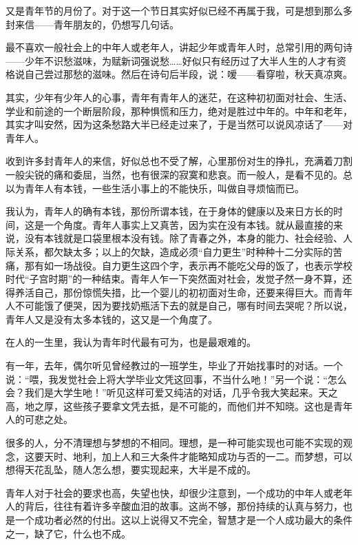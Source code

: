 \par {}
\par 又是青年节的月份了。对于这一个节日其实好似已经不再属于我，可是想到那么多封来信——青年朋友的，仍想写几句话。
\par 最不喜欢一般社会上的中年人或老年人，讲起少年或青年人时，总常引用的两句诗——少年不识愁滋味，为赋新词强说愁……好似只有经历过了大半人生的人才有资格说自己尝过那愁的滋味。然后在诗句后半段，说：嗳——看穿啦，秋天真凉爽。
\par 其实，少年有少年人的心事，青年有青年人的迷茫，在这种初初面对社会、生活、学业和前途的一个断层阶段，那种惧慌和压力，绝对是胜过中年的。中年和老年，其实才叫安然，因为这条愁路大半已经走过来了，于是当然可以说风凉话了——对青年人。
\par 收到许多封青年人的来信，好似总也不受了解，心里那份对生的挣扎，充满着刀割一般尖锐的痛和委屈，当然，也有很深的寂寞和悲哀。而一般人，是看不见的。总以为青年人有本钱，一些生活小事上的不能快乐，叫做自寻烦恼而已。
\par 我认为，青年人的确有本钱，那份所谓本钱，在于身体的健康以及来日方长的时间，这是一个角度。青年人事实上又真苦，因为实在没有本钱。就从最直接的来说，没有本钱就是口袋里根本没有钱。除了青春之外，本身的能力、社会经验、人际关系，都欠缺太多；以上的欠缺，造成必须“自力更生”时种种十二分实际的苦痛，那有如一场战役。自力更生这四个字，表示再不能吃父母的饭了，也表示学校时代“子宫时期”的一种结束。青年人乍一下突然面对社会，发觉孑然一身不算，还得养活自己，那份惊慌失措，比一个婴儿的初初面对生命，还要来得巨大。而青年人不可能饿了便哭，因为要找奶瓶活下去的就是自己，哪有时间去哭呢？所以说，青年人又是没有太多本钱的，这又是一个角度了。
\par 在人的一生里，我认为青年时代最有可为，也是最艰难的。
\par 有一年，去年，偶尔听见曾经教过的一班学生，毕业了开始找事时的对话。一个说：“喂，我发觉社会上将大学毕业文凭这回事，不当什么吔！”另一个说：“怎么会？我们是大学生吔！”听见这样可爱又纯洁的对话，几乎令我大笑起来。天之高，地之厚，这些孩子要拿文凭去抵，是不可能的，而他们并不知晓。这也是青年人的可悲之处。
\par 很多的人，分不清理想与梦想的不相同。理想，是一种可能实现也可能不实现的观念，这要天时、地利，加上人和三大条件才能略知成功与否的一二。而梦想，可以想得天花乱坠，随人怎么想，要实现起来，大半是不成的。
\par 青年人对于社会的要求也高，失望也快，却很少注意到，一个成功的中年人或老年人的背后，往往有着许多辛酸血泪的故事。这尚不够，那份持续的认真与努力，也是一个成功者必然的付出。这以上说得又不完全，智慧才是一个人成功最大的条件之一，缺了它，什么也不成。
